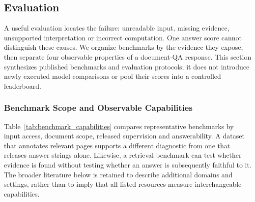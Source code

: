 \subsection{Evaluation}
A useful evaluation locates the failure: unreadable input, missing evidence, unsupported interpretation or incorrect computation. One answer score cannot distinguish these causes. We organize benchmarks by the evidence they expose, then separate four observable properties of a document-QA response. This section synthesizes published benchmarks and evaluation protocols; it does not introduce newly executed model comparisons or pool their scores into a controlled leaderboard.

\subsubsection{Benchmark Scope and Observable Capabilities}

Table~\ref{tab:benchmark_capabilities} compares representative benchmarks by input access, document scope, released supervision and answerability. A dataset that annotates relevant pages supports a different diagnostic from one that releases answer strings alone. Likewise, a retrieval benchmark can test whether evidence is found without testing whether an answer is subsequently faithful to it. The broader literature below is retained to describe additional domains and settings, rather than to imply that all listed resources measure interchangeable capabilities.

